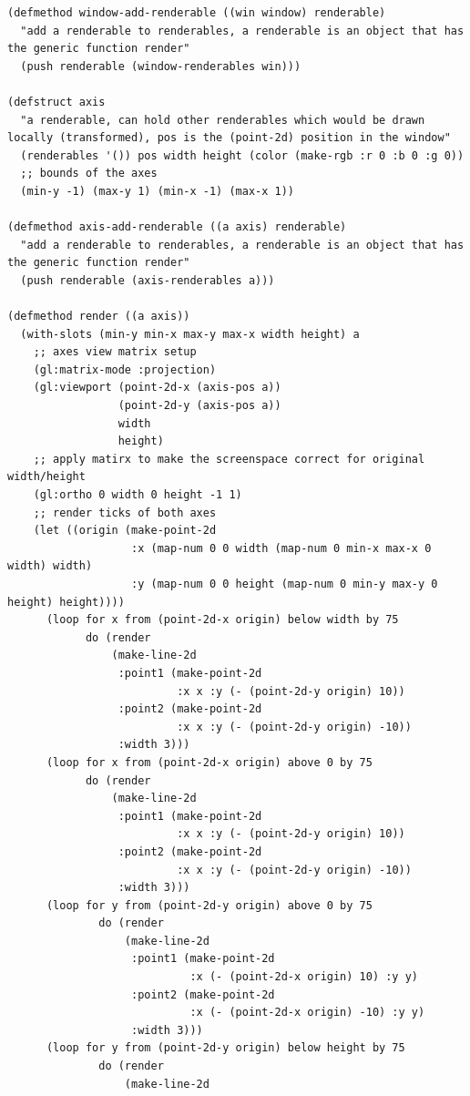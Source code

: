\documentclass[a4paper,12pt]{article}
\begin{document}
\begin{lstlisting}
(defmethod window-add-renderable ((win window) renderable)
  "add a renderable to renderables, a renderable is an object that has the generic function render"
  (push renderable (window-renderables win)))

(defstruct axis
  "a renderable, can hold other renderables which would be drawn locally (transformed), pos is the (point-2d) position in the window"
  (renderables '()) pos width height (color (make-rgb :r 0 :b 0 :g 0))
  ;; bounds of the axes
  (min-y -1) (max-y 1) (min-x -1) (max-x 1))

(defmethod axis-add-renderable ((a axis) renderable)
  "add a renderable to renderables, a renderable is an object that has the generic function render"
  (push renderable (axis-renderables a)))

(defmethod render ((a axis))
  (with-slots (min-y min-x max-y max-x width height) a
    ;; axes view matrix setup
    (gl:matrix-mode :projection)
    (gl:viewport (point-2d-x (axis-pos a))
                 (point-2d-y (axis-pos a))
                 width
                 height)
    ;; apply matirx to make the screenspace correct for original width/height
    (gl:ortho 0 width 0 height -1 1)
    ;; render ticks of both axes
    (let ((origin (make-point-2d
                   :x (map-num 0 0 width (map-num 0 min-x max-x 0 width) width)
                   :y (map-num 0 0 height (map-num 0 min-y max-y 0 height) height))))
      (loop for x from (point-2d-x origin) below width by 75
            do (render
                (make-line-2d
                 :point1 (make-point-2d
                          :x x :y (- (point-2d-y origin) 10))
                 :point2 (make-point-2d
                          :x x :y (- (point-2d-y origin) -10))
                 :width 3)))
      (loop for x from (point-2d-x origin) above 0 by 75
            do (render
                (make-line-2d
                 :point1 (make-point-2d
                          :x x :y (- (point-2d-y origin) 10))
                 :point2 (make-point-2d
                          :x x :y (- (point-2d-y origin) -10))
                 :width 3)))
      (loop for y from (point-2d-y origin) above 0 by 75
              do (render
                  (make-line-2d
                   :point1 (make-point-2d
                            :x (- (point-2d-x origin) 10) :y y)
                   :point2 (make-point-2d
                            :x (- (point-2d-x origin) -10) :y y)
                   :width 3)))
      (loop for y from (point-2d-y origin) below height by 75
              do (render
                  (make-line-2d

\end{lstlisting}
\end{document}
